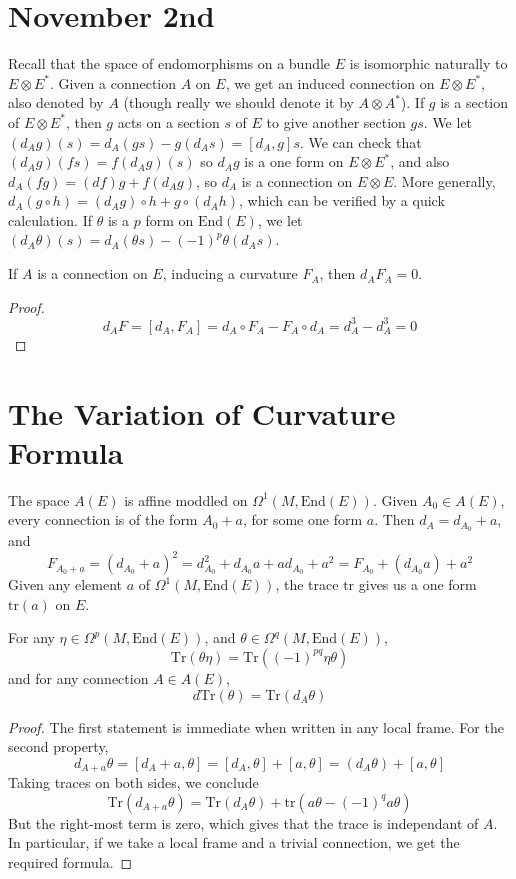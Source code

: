 \section{November 2nd}

Recall that the space of endomorphisms on a bundle $E$ is isomorphic naturally to $E \otimes E^*$. Given a connection $A$ on $E$, we get an induced connection on $E \otimes E^*$, also denoted by $A$ (though really we should denote it by $A \otimes A^*$). If $g$ is a section of $E \otimes E^*$, then $g$ acts on a section $s$ of $E$ to give another section $gs$. We let $(d_A g)(s) = d_A(gs) - g(d_A s) = [d_A, g] s$. We can check that $(d_A g)(fs) = f(d_A g)(s)$ so $d_A g$ is a one form on $E \otimes E^*$, and also $d_A(fg) = (df) g + f (d_A g)$, so $d_A$ is a connection on $E \otimes E$. More generally, $d_A(g \circ h) = (d_A g) \circ h + g \circ (d_A h)$, which can be verified by a quick calculation. If $\theta$ is a $p$ form on $\text{End}(E)$, we let $(d_A \theta)(s) = d_A(\theta s) - (-1)^p \theta(d_A s)$.

\begin{theorem}
    If $A$ is a connection on $E$, inducing a curvature $F_A$, then $d_A F_A = 0$.
\end{theorem}
\begin{proof}
    \[ d_A F = [d_A,F_A] = d_A \circ F_A - F_A \circ d_A = d_A^3 - d_A^3 = 0 \]
\end{proof}

\section{The Variation of Curvature Formula}

The space $A(E)$ is affine moddled on $\Omega^1(M, \text{End}(E))$. Given $A_0 \in A(E)$, every connection is of the form $A_0 + a$, for some one form $a$. Then $d_A = d_{A_0} + a$, and
%
\[ F_{A_0 + a} = (d_{A_0} + a)^2 = d_{A_0}^2 + d_{A_0} a + a d_{A_0} + a^2 = F_{A_0} + (d_{A_0} a) + a^2 \]
%
Given any element $a$ of $\Omega^1(M, \text{End}(E))$, the trace $\text{tr}$ gives us a one form $\text{tr}(a)$ on $E$.

\begin{lemma}
    For any $\eta \in \Omega^p(M,\text{End}(E))$, and $\theta \in \Omega^q(M,\text{End}(E))$,
    \[ \text{Tr}(\theta \eta) = \text{Tr}((-1)^{pq} \eta \theta) \]
    and for any connection $A \in A(E)$,
    \[ d \text{Tr}(\theta) = \text{Tr}(d_A \theta) \]
\end{lemma}
\begin{proof}
    The first statement is immediate when written in any local frame. For the second property,
    \[ d_{A + a} \theta = [d_A + a, \theta] = [d_A, \theta] + [a, \theta] = (d_A \theta) + [a,\theta] \]
    Taking traces on both sides, we conclude
    \[ \text{Tr}(d_{A + a} \theta) = \text{Tr}(d_A \theta) + \text{tr}(a \theta - (-1)^q a \theta) \]
    But the right-most term is zero, which gives that the trace is independant of $A$. In particular, if we take a local frame and a trivial connection, we get the required formula.
\end{proof}

